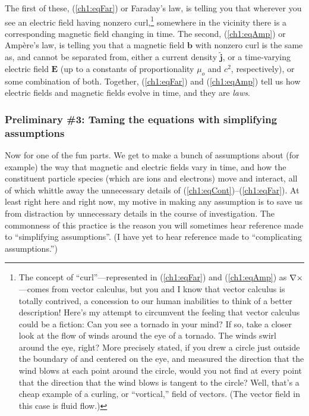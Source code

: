The first of these, (\ref{ch1:eqFar}) or Faraday's law, is telling you that
wherever you see an electric field having nonzero curl,\footnote{The concept of
  ``curl''---represented in (\ref{ch1:eqFar}) and (\ref{ch1:eqAmp}) as
  ${\bf \nabla} \times$---comes from vector calculus, but you and I know that vector
  calculus is totally contrived, a concession to our human inabilities to think
  of a better description! Here's my attempt to circumvent the feeling that
  vector calculus could be a fiction: Can you see a tornado in your mind? If so,
  take a closer look at the flow of winds around the eye of a tornado. The winds
  swirl around the eye, right? More precisely stated, if you drew a circle just
  outside the boundary of and centered on the eye, and measured the direction
  that the wind blows at each point around the circle, would you not find at
  every point that the direction that the wind blows is tangent to the circle?
  Well, that's a cheap example of a curling, or ``vortical,'' field of
  vectors. (The vector field in this case is fluid flow.)  } somewhere in the
vicinity there is a corresponding magnetic field changing in time. The second,
(\ref{ch1:eqAmp}) or Amp\`{e}re's law, is telling you that a magnetic field
$\mathbf{b}$ with nonzero curl is the same as, and cannot be separated from,
either a current density $\mathbf{\tilde j}$, or a time-varying electric field
$\mathbf{E}$ (up to a constants of proportionality $\mu_o$ and $c^2$,
respectively), or some combination of both. Together, (\ref{ch1:eqFar}) and
(\ref{ch1:eqAmp}) tell us how electric fields and magnetic fields evolve in
time, and they are \emph{laws}.

\subsubsection{Preliminary \#3: Taming the equations with simplifying assumptions} \label{ch1:sssAssume}

Now for one of the fun parts. We get to make a bunch of assumptions about (for
example) the way that magnetic and electric fields vary in time, and how the
constituent particle species (which are ions and electrons) move and interact,
all of which whittle away the unnecessary details of
(\ref{ch1:eqCont})--(\ref{ch1:eqFar}). At least right here and right now, my
motive in making any assumption is to save us from distraction by unnecessary
details in the course of investigation. The commonness of this practice is the
reason you will sometimes hear reference made to ``simplifying assumptions''. (I
have yet to hear reference made to ``complicating assumptions.'')

